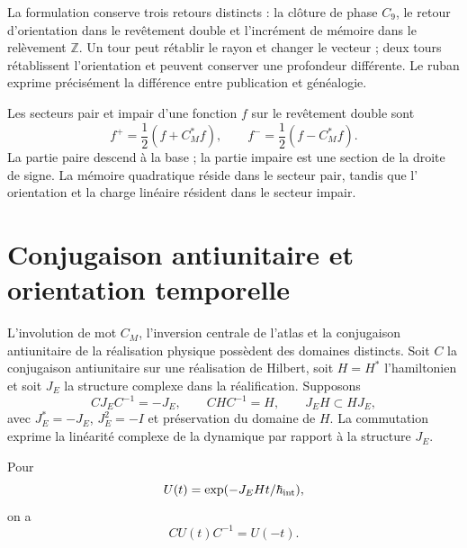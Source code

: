 La formulation conserve trois retours distincts : la clôture de phase
\(C_9\), le retour d'orientation dans le revêtement double et l'incrément de
mémoire dans le relèvement \(\mathbb Z\). Un tour peut rétablir le
rayon et changer le vecteur ; deux tours rétablissent l'orientation et peuvent
conserver une profondeur différente. Le ruban exprime précisément la
différence entre publication et généalogie.

Les secteurs pair et impair d'une fonction \(f\) sur le revêtement double sont
\begin{equation}
 f^+=\frac12(f+C_M^*f),
 \qquad
 f^-=\frac12(f-C_M^*f).
 \label{eq:rm-obs-even-odd-decomposition}
\end{equation}
La partie paire descend à la base ; la partie impaire est une section de la
droite de signe. La mémoire quadratique réside dans le secteur pair, tandis que l'
orientation et la charge linéaire résident dans le secteur impair.

\section{Conjugaison antiunitaire et orientation temporelle}

L'involution de mot \(C_M\), l'inversion centrale de l'atlas et la
conjugaison antiunitaire de la réalisation physique possèdent des domaines
distincts. Soit \(C\) la conjugaison antiunitaire sur une réalisation de
Hilbert, soit \(H=H^*\) l'hamiltonien et soit \(J_E\) la structure complexe
dans la réalification. Supposons
\begin{equation}
 CJ_EC^{-1}=-J_E,
 \qquad
 CHC^{-1}=H,
 \qquad
 J_EH\subset HJ_E,
 \label{eq:rm-obs-antiunitary-hypotheses}
\end{equation}
avec \(J_E^*=-J_E\), \(J_E^2=-I\) et préservation du domaine de \(H\).
La commutation exprime la linéarité complexe de la dynamique par rapport à
la structure \(J_E\).

\begin{proposition}
\label{prop:rm-obs-antiunitary-time}
Pour
\begin{equation}
 U(t)=\exp(-J_EHt/\hbar_{\rm int}),
 \label{eq:rm-obs-unitary-evolution}
\end{equation}
on a
\begin{equation}
 \boxed{CU(t)C^{-1}=U(-t).}
 \label{eq:rm-obs-time-reversal}
\end{equation}
\end{proposition}

